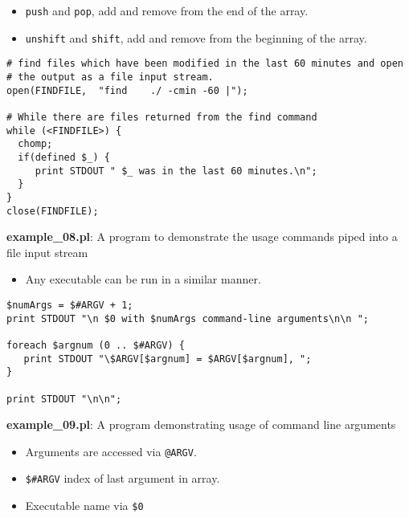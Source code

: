 \documentclass[17pt,dvips]{foils}
\begin{document}
\begin{itemize}
\item \texttt{push} and \texttt{pop}, add and remove from the end of the array.
\item \texttt{unshift} and \texttt{shift}, add and remove from the beginning of the array.
\end{itemize}



\begin{verbatim}
# find files which have been modified in the last 60 minutes and open
# the output as a file input stream.
open(FINDFILE,  "find    ./ -cmin -60 |");

# While there are files returned from the find command
while (<FINDFILE>) {
  chomp;
  if(defined $_) {
     print STDOUT " $_ was in the last 60 minutes.\n";
  }
}
close(FINDFILE);
\end{verbatim}
{\bf example\_08.pl}: A program to demonstrate the usage commands piped into a
file input stream


\begin{itemize}
\item Any executable can be run in a similar manner.
\end{itemize}



\begin{verbatim}
$numArgs = $#ARGV + 1;
print STDOUT "\n $0 with $numArgs command-line arguments\n\n ";

foreach $argnum (0 .. $#ARGV) {
   print STDOUT "\$ARGV[$argnum] = $ARGV[$argnum], ";
}

print STDOUT "\n\n";
\end{verbatim}
{\bf example\_09.pl}: A program demonstrating usage of command line arguments

\begin{itemize}
\item Arguments are accessed via \texttt{@ARGV}.
\item \texttt{\$\#ARGV} index of last argument in array.
\item Executable name via \texttt{\$0}
\end{itemize}
\end{document}
